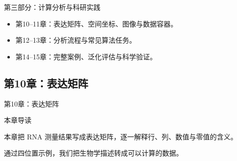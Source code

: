 \begin{frame}{第三部分：计算分析与科研实践}\relax
{}\begin{itemize}\wideitems
\item 第10--11章：表达矩阵、空间坐标、图像与数据容器。
\item 第12--13章：分析流程与常见算法任务。
\item 第14--15章：完整案例、泛化评估与科学验证。
\end{itemize}
\end{frame}

\subsection{第10章：表达矩阵}

\begin{frame}{第10章：表达矩阵}\relax
\vfill\begin{center}\begin{minipage}{.86\linewidth}
{\large\color{AcademicBlue}本章导读\par}\vspace{4mm}
{\Large 本章把 RNA 测量结果写成表达矩阵，逐一解释行、列、数值与零值的含义。\par\vspace{4mm}通过四位置示例，我们把生物学描述转成可以计算的数据。\par}
\end{minipage}\end{center}\vfill
{}
\end{frame}

